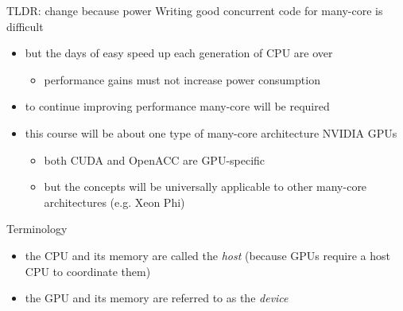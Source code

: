 \documentclass[aspectratio=43]{beamer}
\begin{document}
\begin{frame}[fragile]{}
    \begin{info}{TLDR: change because power}
        Writing good concurrent code for many-core is difficult
        \begin{itemize}
            \item but the days of easy speed up each generation of CPU are over
            \begin{itemize}
                \item performance gains must not increase power consumption
            \end{itemize}
            \item to continue improving performance many-core will be required
            \item this course will be about one type of many-core architecture NVIDIA GPUs
            \begin{itemize}
                \item both CUDA and OpenACC are GPU-specific
                \item but the concepts will be universally applicable to other many-core architectures (e.g. Xeon Phi)
            \end{itemize}
        \end{itemize}
    \end{info}
\end{frame}

\begin{frame}[fragile]{}
    \begin{info}{Terminology}
        \begin{itemize}
            \item the CPU and its memory are called the \emph{host} (because GPUs require a host CPU to coordinate them)
            \item the GPU and its memory are referred to as the \emph{device}
        \end{itemize}
    \end{info}
\end{frame}

\end{document}
